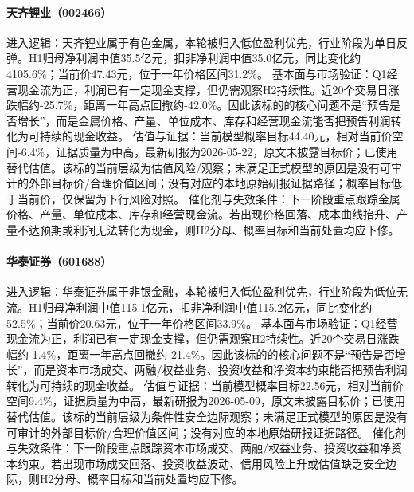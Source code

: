 \paragraph{天齐锂业（002466）}
进入逻辑：天齐锂业属于有色金属，本轮被归入低位盈利优先，行业阶段为单日反弹。H1归母净利润中值35.5亿元，扣非净利润中值35.0亿元，同比变化约4105.6\%；当前价47.43元，位于一年价格区间31.2\%。
基本面与市场验证：Q1经营现金流为正，利润已有一定现金支撑，但仍需观察H2持续性。近20个交易日涨跌幅约-25.7\%，距离一年高点回撤约-42.0\%。因此该标的的核心问题不是“预告是否增长”，而是金属价格、产量、单位成本、库存和经营现金流能否把预告利润转化为可持续的现金收益。
估值与证据：当前模型概率目标44.40元，相对当前价空间-6.4\%，证据质量为中高，最新研报为2026-05-22，原文未披露目标价；已使用替代估值。该标的当前层级为估值风险/观察；未满足正式模型的原因是没有可审计的外部目标价/合理价值区间；没有对应的本地原始研报证据路径；概率目标低于当前价，仅保留为下行风险对照。
催化剂与失效条件：下一阶段重点跟踪金属价格、产量、单位成本、库存和经营现金流。若出现价格回落、成本曲线抬升、产量不达预期或利润无法转化为现金，则H2分母、概率目标和当前处置均应下修。

\paragraph{华泰证券（601688）}
进入逻辑：华泰证券属于非银金融，本轮被归入低位盈利优先，行业阶段为低位无流。H1归母净利润中值115.1亿元，扣非净利润中值115.2亿元，同比变化约52.5\%；当前价20.63元，位于一年价格区间33.9\%。
基本面与市场验证：Q1经营现金流为正，利润已有一定现金支撑，但仍需观察H2持续性。近20个交易日涨跌幅约-1.4\%，距离一年高点回撤约-21.4\%。因此该标的的核心问题不是“预告是否增长”，而是资本市场成交、两融/权益业务、投资收益和净资本约束能否把预告利润转化为可持续的现金收益。
估值与证据：当前模型概率目标22.56元，相对当前价空间9.4\%，证据质量为中高，最新研报为2026-05-09，原文未披露目标价；已使用替代估值。该标的当前层级为条件性安全边际观察；未满足正式模型的原因是没有可审计的外部目标价/合理价值区间；没有对应的本地原始研报证据路径。
催化剂与失效条件：下一阶段重点跟踪资本市场成交、两融/权益业务、投资收益和净资本约束。若出现市场成交回落、投资收益波动、信用风险上升或估值缺乏安全边际，则H2分母、概率目标和当前处置均应下修。

